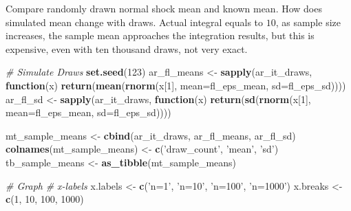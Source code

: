 \documentclass[
]{book}
\newenvironment{Shaded}{\begin{snugshade}}{\end{snugshade}}
\newcommand{\CommentTok}[1]{\textcolor[rgb]{0.56,0.35,0.01}{\textit{#1}}}
\newcommand{\ControlFlowTok}[1]{\textcolor[rgb]{0.13,0.29,0.53}{\textbf{#1}}}
\newcommand{\DataTypeTok}[1]{\textcolor[rgb]{0.13,0.29,0.53}{#1}}
\newcommand{\DecValTok}[1]{\textcolor[rgb]{0.00,0.00,0.81}{#1}}
\newcommand{\KeywordTok}[1]{\textcolor[rgb]{0.13,0.29,0.53}{\textbf{#1}}}
\newcommand{\NormalTok}[1]{#1}
\newcommand{\StringTok}[1]{\textcolor[rgb]{0.31,0.60,0.02}{#1}}
\begin{document}
Compare randomly drawn normal shock mean and known mean. How does simulated mean change with draws. Actual integral equals to \(10\), as sample size increases, the sample mean approaches the integration results, but this is expensive, even with ten thousand draws, not very exact.

\begin{Shaded}
\begin{Highlighting}[]
\CommentTok{# Simulate Draws}
\KeywordTok{set.seed}\NormalTok{(}\DecValTok{123}\NormalTok{)}
\NormalTok{ar_fl_means <-}
\StringTok{  }\KeywordTok{sapply}\NormalTok{(ar_it_draws, }\ControlFlowTok{function}\NormalTok{(x)}
    \KeywordTok{return}\NormalTok{(}\KeywordTok{mean}\NormalTok{(}\KeywordTok{rnorm}\NormalTok{(x[}\DecValTok{1}\NormalTok{], }\DataTypeTok{mean=}\NormalTok{fl_eps_mean, }\DataTypeTok{sd=}\NormalTok{fl_eps_sd))))}
\NormalTok{ar_fl_sd <-}
\StringTok{  }\KeywordTok{sapply}\NormalTok{(ar_it_draws, }\ControlFlowTok{function}\NormalTok{(x)}
    \KeywordTok{return}\NormalTok{(}\KeywordTok{sd}\NormalTok{(}\KeywordTok{rnorm}\NormalTok{(x[}\DecValTok{1}\NormalTok{], }\DataTypeTok{mean=}\NormalTok{fl_eps_mean, }\DataTypeTok{sd=}\NormalTok{fl_eps_sd))))}

\NormalTok{mt_sample_means <-}\StringTok{ }\KeywordTok{cbind}\NormalTok{(ar_it_draws, ar_fl_means, ar_fl_sd)}
\KeywordTok{colnames}\NormalTok{(mt_sample_means) <-}\StringTok{ }\KeywordTok{c}\NormalTok{(}\StringTok{'draw_count'}\NormalTok{, }\StringTok{'mean'}\NormalTok{, }\StringTok{'sd'}\NormalTok{)}
\NormalTok{tb_sample_means <-}\StringTok{ }\KeywordTok{as_tibble}\NormalTok{(mt_sample_means)}

\CommentTok{# Graph}
\CommentTok{# x-labels}
\NormalTok{x.labels <-}\StringTok{ }\KeywordTok{c}\NormalTok{(}\StringTok{'n=1'}\NormalTok{, }\StringTok{'n=10'}\NormalTok{, }\StringTok{'n=100'}\NormalTok{, }\StringTok{'n=1000'}\NormalTok{)}
\NormalTok{x.breaks <-}\StringTok{ }\KeywordTok{c}\NormalTok{(}\DecValTok{1}\NormalTok{, }\DecValTok{10}\NormalTok{, }\DecValTok{100}\NormalTok{, }\DecValTok{1000}\NormalTok{)}


\end{Highlighting}
\end{Shaded}
\end{document}
